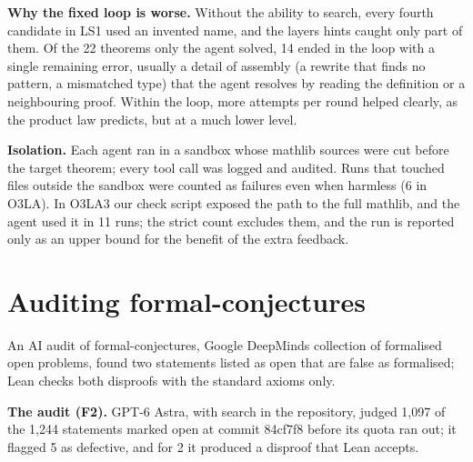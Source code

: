 \documentclass[11pt,a4paper]{article}
\begin{document}
\textbf{Why the fixed loop is worse.} Without the ability to search, every fourth candidate in LS1 used an invented name, and the layer\textquotesingle s hints caught only part of them. Of the 22 theorems only the agent solved, 14 ended in the loop with a single remaining error, usually a detail of assembly (a rewrite that finds no pattern, a mismatched type) that the agent resolves by reading the definition or a neighbouring proof. Within the loop, more attempts per round helped clearly, as the product law predicts, but at a much lower level.

\textbf{Isolation.} Each agent ran in a sandbox whose mathlib sources were cut before the target theorem; every tool call was logged and audited. Runs that touched files outside the sandbox were counted as failures even when harmless (6 in O3LA). In O3LA3 our check script exposed the path to the full mathlib, and the agent used it in 11 runs; the strict count excludes them, and the run is reported only as an upper bound for the benefit of the extra feedback.

\section{Auditing formal-conjectures}

An AI audit of formal-conjectures, Google DeepMind\textquotesingle s collection of formalised open problems, found two statements listed as open that are false as formalised; Lean checks both disproofs with the standard axioms only.

\textbf{The audit (F2).} GPT-6 Astra, with search in the repository, judged 1,097 of the 1,244 statements marked open at commit 84cf7f8 before its quota ran out; it flagged 5 as defective, and for 2 it produced a disproof that Lean accepts.
\end{document}
